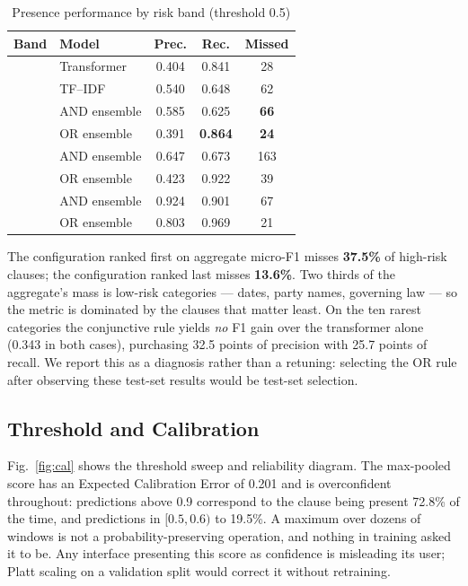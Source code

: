 \documentclass[journal,a4paper]{IEEEtran}
\begin{document}
\begin{table}[!t]
\caption{Presence performance by risk band (threshold 0.5)}
\label{tab:risk}
\centering
\begin{tabular}{llccc}
\toprule
\textbf{Band} & \textbf{Model} & \textbf{Prec.} & \textbf{Rec.} & \textbf{Missed}\\
\midrule
{}
 & Transformer   & 0.404 & 0.841 & 28\\
 & TF--IDF       & 0.540 & 0.648 & 62\\
 & AND ensemble  & 0.585 & 0.625 & \textbf{66}\\
 & OR ensemble   & 0.391 & \textbf{0.864} & \textbf{24}\\
\addlinespace
{}
 & AND ensemble  & 0.647 & 0.673 & 163\\
 & OR ensemble   & 0.423 & 0.922 & 39\\
\addlinespace
{}
 & AND ensemble  & 0.924 & 0.901 & 67\\
 & OR ensemble   & 0.803 & 0.969 & 21\\
\bottomrule
\end{tabular}
\end{table}

The configuration ranked first on aggregate micro-F1 misses \textbf{37.5\%} of high-risk
clauses; the configuration ranked last misses \textbf{13.6\%}. Two thirds of the aggregate's
mass is low-risk categories --- dates, party names, governing law --- so the metric is dominated
by the clauses that matter least. On the ten rarest categories the conjunctive rule yields
\emph{no} F1 gain over the transformer alone (0.343 in both cases), purchasing 32.5 points of
precision with 25.7 points of recall. We report this as a diagnosis rather than a retuning:
selecting the OR rule after observing these test-set results would be test-set selection.

\subsection{Threshold and Calibration}
Fig.~\ref{fig:cal} shows the threshold sweep and reliability diagram. The max-pooled score has
an Expected Calibration Error of 0.201 and is overconfident throughout: predictions above 0.9
correspond to the clause being present 72.8\% of the time, and predictions in $[0.5,0.6)$ to
19.5\%. A maximum over dozens of windows is not a probability-preserving operation, and nothing
in training asked it to be. Any interface presenting this score as confidence is misleading its
user; Platt scaling on a validation split would correct it without retraining.
\end{document}
